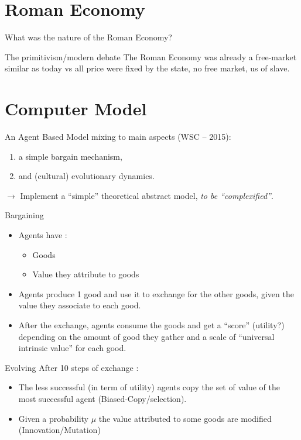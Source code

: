\documentclass[final]{beamer}
\begin{document}
\begin{frame}
\section{Roman Economy}
	\begin{center}
		\Huge
		What was the nature of the Roman Economy?\\
	\end{center}
	\vfill
	\begin{block}
		{The primitivism/modern debate}
		The Roman Economy was already a free-market similar as today vs all price were fixed by the state, no free market, us of slave.
	\end{block}
\section{Computer Model}

	An Agent Based Model mixing to main aspects (WSC -- 2015):

	\vfil
	\begin{enumerate}
		\item a	simple bargain mechanism,
		\item and (cultural) evolutionary dynamics.
	\end{enumerate}

	\vfill
	$\rightarrow$ Implement a ``simple'' theoretical abstract model, \emph{to be ``complexified''}.



	
	\begin{block}{Bargaining}
		\begin{itemize}
			\item Agents have :
				\begin{itemize}
					\item Goods
					\item Value they attribute to goods
				\end{itemize}
			\item Agents produce 1 good and use it to exchange for the other goods, given the value they associate to each good.
			\item After the exchange, agents consume the goods and get a ``score'' (utility?) depending on the amount of good they gather and a scale of ``universal intrinsic value'' for each good.
		\end{itemize}

	\end{block}

	\begin{block}{Evolving}
		After 10 steps of exchange :
		\begin{itemize}
			\item  The less successful (in term of utility) agents copy the set of value of the most successful agent (Biased-Copy/selection).
			\item Given a probability $\mu$ the value attributed to some goods are modified (Innovation/Mutation)
		\end{itemize}


\end{block}
\end{frame}
\end{document}
